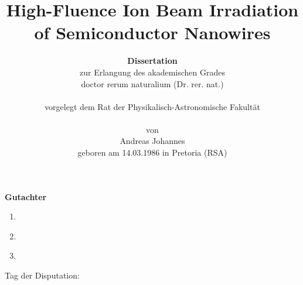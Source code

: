 
\title{High-Fluence Ion Beam Irradiation of Semiconductor Nanowires}


\author{\textbf{Dissertation}\\
zur Erlangung des akademischen Grades\\
doctor rerum naturalium (Dr. rer. nat.)\\
\\
vorgelegt dem Rat der Physikalisch-Astronomische Fakultät\\
\\
von\\
Andreas Johannes\\
geboren am 14.03.1986 in Pretoria (RSA)}
\date{}
\maketitle

\clearpage

\vspace{10cm}
\textbf{\large{Gutachter}}

\vspace{0.5cm}
\begin{enumerate}

\item \underline{\hspace{7cm}}
\\
\item \underline{\hspace{7cm}}
\\
\item \underline{\hspace{7cm}}
\\
\end{enumerate}
\vspace{1.5cm}
Tag der Disputation: \underline{\hspace{7cm}}
